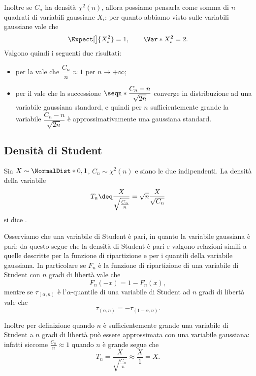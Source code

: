 Inoltre se $C_n$ ha densità $\chi^2(n)$, allora possiamo pensarla come somma di $n$ quadrati di variabili gaussiane $X_i$: per quanto abbiamo visto sulle variabili gaussiane vale che \[
    \Expect[\big]{X_i^2} = 1, \qquad \Var*{X_i^2} = 2.    
\] Valgono quindi i seguenti due risultati: \begin{itemize}
    \item per la  vale che $\dfrac{C_n}{n} \approx 1$ per $n \to +\infty$;
    \item per il  vale che la successione $\seqn*{\dfrac{C_n - n}{\sqrt{2n}}}$ converge in distribuzione ad una variabile gaussiana standard, e quindi per $n$ sufficientemente grande la variabile $\dfrac{C_n - n}{\sqrt{2n}}$ è approssimativamente una gaussiana standard.
\end{itemize}

\subsection{Densità di Student}

\begin{definition}
     Sia $X \sim \NormalDist*{0, 1}$, $C_n \sim \chi^2(n)$ e siano le due indipendenti. La densità della variabile \[
        T_n \deq \frac{X}{\sqrt{\frac{C_n}{n}}} = \sqrt n \frac{X}{\sqrt{C_n}} 
    \] si dice .
\end{definition}

Osserviamo che una variabile di Student è pari, in quanto la variabile gaussiana è pari: da questo segue che la densità di Student è pari e valgono relazioni simili a quelle descritte per la funzione di ripartizione e per i quantili della variabile gaussiana. In particolare se $F_n$ è la funzione di ripartizione di una variabile di Student con $n$ gradi di libertà vale che \[
    F_n(-x) = 1 - F_n(x),    
\] mentre se $\tau_{(\alpha, n)}$ è l'$\alpha$-quantile di una variabile di Student ad $n$ gradi di libertà vale che \[
    \tau_{(\alpha, n)} = -\tau_{(1-\alpha, n)}.
\]

Inoltre per definizione quando $n$ è sufficientemente grande una variabile di Student a $n$ gradi di libertà può essere approssimata con una variabile gaussiana: infatti siccome $\frac{C_n}{n} \approx 1$ quando $n$ è grande segue che \[
    T_n = \frac{X}{\sqrt{\frac{C_n}{n}}} \approx \frac{X}{1} = X.    
\]